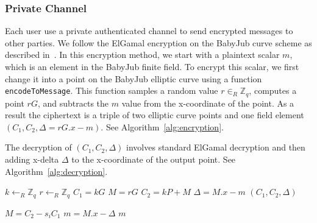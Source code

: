 \documentclass{article}
\begin{document}
\subsubsection{Private Channel}

Each user use a private authenticated channel to send encrypted messages to other parties. We follow the ElGamal encryption on the BabyJub curve scheme as described in~\cite{ElGamalEncryptionDecryption2020,jieWeijiekohElgamalbabyjub2023}.  In this encryption method, we start with a plaintext scalar $m$, which is an element in the BabyJub finite field. To encrypt this scalar, we first change it into a point on the BabyJub elliptic curve using a function \texttt{encodeToMessage}. This function samples a random value \( r \in_{R} \mathbb{Z}_q\), computes a point \( rG \), and subtracts the $m$ value from the x-coordinate of the point. As a result the ciphertext is a triple of two elliptic curve points and one field element $(C_1, C_2, \Delta=rG.x - m)$. See Algorithm~\ref{alg:encryption}.

The decryption of $(C_1, C_2, \Delta)$ involves standard ElGamal decryption and then adding x-delta $\Delta$ to the x-coordinate of the output point. See Algorithm~\ref{alg:decryption}.

\begin{algorithm}
    \caption{$\texttt{Enc}_{P_i}$}
    \label{alg:encryption}
    
    
    $k \gets_R \mathbb{Z}_q$\;
    $r \gets_R \mathbb{Z}_q$\;
    $C_1 = kG$\;
    $M = rG$\;
    $C_2 = kP + M$\;
    $\Delta = M.x - m$\;
    \Return $(C_1, C_2, \Delta)$
\end{algorithm}

\begin{algorithm}
    \caption{$\texttt{Dec}_{s_i}$}
    \label{alg:decryption}
    
    
    $M = C_2 - s_i C_1$\;
    $m = M.x - \Delta$\;
    \Return $m$
\end{algorithm}
\end{document}
